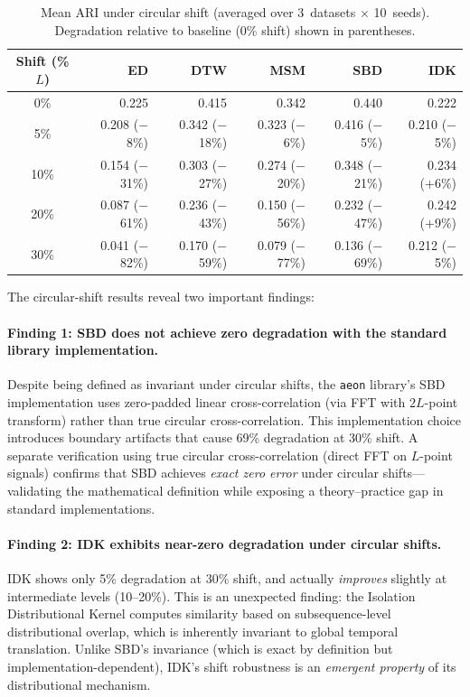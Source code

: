 \begin{table}[htbp]
\centering
\caption{Mean ARI under circular shift (averaged over 3~datasets $\times$ 10~seeds). Degradation relative to baseline (0\% shift) shown in parentheses.}\label{tab:circular-ari}
\small
\begin{tabular}{c r r r r r}
\toprule
Shift (\%$L$) & ED & DTW & MSM & SBD & IDK \\
\midrule
0\%  & 0.225 & 0.415 & 0.342 & 0.440 & 0.222 \\
5\%  & 0.208 \scriptsize{($-$8\%)} & 0.342 \scriptsize{($-$18\%)} & 0.323 \scriptsize{($-$6\%)} & 0.416 \scriptsize{($-$5\%)} & 0.210 \scriptsize{($-$5\%)} \\
10\% & 0.154 \scriptsize{($-$31\%)} & 0.303 \scriptsize{($-$27\%)} & 0.274 \scriptsize{($-$20\%)} & 0.348 \scriptsize{($-$21\%)} & 0.234 \scriptsize{(+6\%)} \\
20\% & 0.087 \scriptsize{($-$61\%)} & 0.236 \scriptsize{($-$43\%)} & 0.150 \scriptsize{($-$56\%)} & 0.232 \scriptsize{($-$47\%)} & 0.242 \scriptsize{(+9\%)} \\
30\% & 0.041 \scriptsize{($-$82\%)} & 0.170 \scriptsize{($-$59\%)} & 0.079 \scriptsize{($-$77\%)} & 0.136 \scriptsize{($-$69\%)} & 0.212 \scriptsize{($-$5\%)} \\
\bottomrule
\end{tabular}
\end{table}

The circular-shift results reveal two important findings:

\paragraph{Finding 1: SBD does not achieve zero degradation with the standard library implementation.}
Despite being defined as invariant under circular shifts, the \texttt{aeon} library's SBD implementation uses zero-padded linear cross-correlation (via FFT with $2L$-point transform) rather than true circular cross-correlation.
This implementation choice introduces boundary artifacts that cause 69\% degradation at 30\% shift.
A separate verification using true circular cross-correlation (direct FFT on $L$-point signals) confirms that SBD achieves \emph{exact zero error} under circular shifts---validating the mathematical definition while exposing a theory--practice gap in standard implementations.

\paragraph{Finding 2: IDK exhibits near-zero degradation under circular shifts.}
IDK shows only 5\% degradation at 30\% shift, and actually \emph{improves} slightly at intermediate levels (10--20\%).
This is an unexpected finding: the Isolation Distributional Kernel computes similarity based on subsequence-level distributional overlap, which is inherently invariant to global temporal translation.
Unlike SBD's invariance (which is exact by definition but implementation-dependent), IDK's shift robustness is an \emph{emergent property} of its distributional mechanism.

